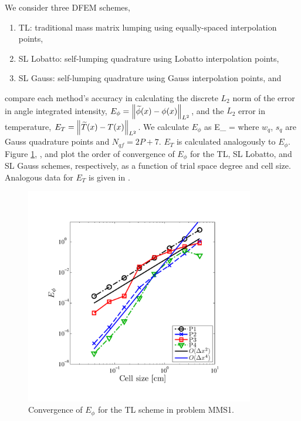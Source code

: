 We consider three DFEM schemes,
\begin{enumerate}
\item TL: traditional mass matrix lumping using equally-spaced interpolation points,
\item SL Lobatto: self-lumping quadrature using Lobatto interpolation points,
\item SL Gauss: self-lumping quadrature using Gauss interpolation points, and
\end{enumerate}  
compare each method's accuracy in calculating the discrete $L_2$ norm of the error in angle integrated intensity, $E_{\phi} = \left\lVert  \widetilde{\phi}(x) - \phi(x) \right\rVert_{L^2}$, and the $L_2$ error in temperature, $E_T = \left\lVert  \widetilde{T}(x) - T(x)  \right\rVert_{L^2}$.
We calculate $E_{\phi}$ as
\benum
E_{\phi} = \pec
\label{eq:e_phi_6}
\eenum
where $w_q$, $s_q$ are Gauss quadrature points and $N_{qf} = 2P+7$.  $E_{T}$ is calculated analogously to $E_{\phi}$.
Figure \ref{fig:mms1_tl_phi}, , and  plot the order of convergence of $E_{\phi}$ for the TL, SL Lobatto, and SL Gauss schemes, respectively, as a function of trial space degree and cell size.
Analogous data for $E_{T}$ is given in .
%
\begin{figure}[!htp]
\centering
\includegraphics[width=10cm,trim=0.25in  0.5in 0.75in 0.75in,clip=true]{chapter6_grey_radtran/Dissertation_Data/MMS2_TL_phi_L2.pdf}
\caption{Convergence of $E_{\phi}$ for the TL scheme in problem MMS1.}
\label{fig:mms1_tl_phi}
\end{figure}
